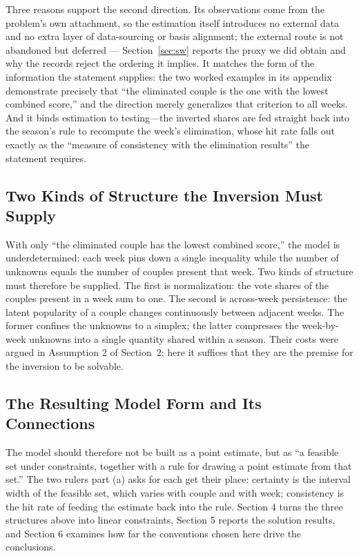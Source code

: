 Three reasons support the second direction. Its observations come from the problem's own attachment, so the estimation itself introduces no external data and no extra layer of data-sourcing or basis alignment; the external route is not abandoned but deferred --- Section~\ref{sec:sw} reports the proxy we did obtain and why the records reject the ordering it implies. It matches the form of the information the statement supplies: the two worked examples in its appendix demonstrate precisely that ``the eliminated couple is the one with the lowest combined score,'' and the direction merely generalizes that criterion to all weeks. And it binds estimation to testing---the inverted shares are fed straight back into the season's rule to recompute the week's elimination, whose hit rate falls out exactly as the ``measure of consistency with the elimination results'' the statement requires.

\subsection{Two Kinds of Structure the Inversion Must Supply}

With only ``the eliminated couple has the lowest combined score,'' the model is underdetermined: each week pins down a single inequality while the number of unknowns equals the number of couples present that week. Two kinds of structure must therefore be supplied. The first is normalization: the vote shares of the couples present in a week sum to one. The second is across-week persistence: the latent popularity of a couple changes continuously between adjacent weeks. The former confines the unknowns to a simplex; the latter compresses the week-by-week unknowns into a single quantity shared within a season. Their costs were argued in Assumption 2 of Section~2; here it suffices that they are the premise for the inversion to be solvable.

\subsection{The Resulting Model Form and Its Connections}

The model should therefore not be built as a point estimate, but as ``a feasible set under constraints, together with a rule for drawing a point estimate from that set.'' The two rulers part (a) asks for each get their place: certainty is the interval width of the feasible set, which varies with couple and with week; consistency is the hit rate of feeding the estimate back into the rule. Section 4 turns the three structures above into linear constraints, Section 5 reports the solution results, and Section 6 examines how far the conventions chosen here drive the conclusions.
